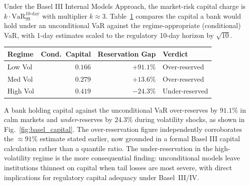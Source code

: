 \documentclass[]{interact}
\begin{document}
Under the Basel III Internal Models Approach, the market-risk capital charge
is $k\cdot\text{VaR}_{99}^{\text{10-day}}$ with multiplier $k\!\approx\!3$.
Table~\ref{tab:basel} compares the capital a bank would hold under an
unconditional VaR against the regime-appropriate (conditional) VaR, with
1-day estimates scaled to the regulatory 10-day horizon by $\sqrt{10}$.

\begin{table}[H]
{\renewcommand{\arraystretch}{1.25}
\setlength{\tabcolsep}{5pt}
\begin{tabular}{lrrl}
\toprule
\textbf{Regime} & \textbf{Cond.\ Capital} & \textbf{Reservation Gap} & \textbf{Verdict} \\
\midrule
Low Vol  & $0.166$ & $+91.1\%$ & Over-reserved \\
Med Vol  & $0.279$ & $+13.6\%$ & Over-reserved \\
High Vol & $0.419$ & $-24.3\%$ & Under-reserved \\
\bottomrule
\end{tabular}}
\label{tab:basel}
\end{table}

A bank holding capital against the unconditional VaR over-reserves by
$91.1\%$ in calm markets and \emph{under}-reserves by $24.3\%$ during
volatility shocks, as shown in Fig.~\ref{fig:basel_capital}. The over-reservation figure independently corroborates
the $\approx\!91\%$ estimate stated earlier, now grounded in a formal
Basel III capital calculation rather than a quantile ratio. The
under-reservation in the high-volatility regime is the more consequential
finding: unconditional models leave institutions thinnest on capital
when tail losses are most severe, with direct implications for
regulatory capital adequacy under Basel~III/IV.

\end{document}

